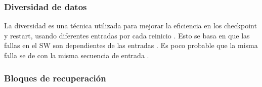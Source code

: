 \begin{comment}

\begin{figure}[h]
 \centering
 \begin{tikzpicture}[node distance=1cm, auto,]
   \tikzset{
   cuadro/.style={
           rectangle,
           draw=black,
           text width=6.5em,
           minimum height=2em,
           text centered},
    arrow/.style={
           ->,
           thick,
           shorten <=2pt,
           shorten >=2pt,}	
    }
  \tikzstyle{circulo} = [draw, fill=black, circle, node distance=1cm, minimum size=5pt, inner 
sep=3pt]
    
  \node[inner sep=5pt] (entrada) {Entrada};
  \node[cuadro, right=0.5cm of entrada] (prim) {Procesador Primario};
  \node[cuadro, inner sep=5pt,below=0.5cm of prim] (secu) {Procesador Secundario};
  \node[cuadro, inner sep=10pt, right=1cm of prim] (selec) {Switch};
  \node[inner sep=0pt, right=2cm of selec](ghost1){};
  \node[cuadro, below=0.5cm of ghost1](detector) {Detector de error};
  \node[inner sep=0pt, right=0.5cm of ghost1] (salida) {Salida};
  
  \draw[arrow] (entrada)--(prim);
  \draw[arrow] (entrada)|-(secu);
  \draw[arrow, dashed] (prim.-30) -- (secu.30);
  \draw[arrow, dashed] (secu.150) -- (prim.-150);
  \draw[arrow] (prim)--(selec);
  \draw[arrow] (secu)-|(selec.-150);
  \draw[arrow] (detector)-|(selec);
  \draw[arrow] (selec)--(salida);
  \draw[arrow] (ghost1)--(detector);
 \end{tikzpicture}
 \caption{Representación del proceso pares}
 \label{fig:repPares}
\end{figure}

\end{comment}

\subsubsection{Diversidad de datos}
La diversidad es una técnica utilizada para mejorar la eficiencia en los checkpoint y restart, 
usando diferentes entradas por cada reinicio \citep{FTDesign}. Esto se basa en que las fallas en el 
\ac{SW} son dependientes de las entradas \citep{FTDesign}. Es poco probable que la misma falla se 
de con la misma secuencia de entrada \citep{FTDesign}.

\subsubsection{Bloques de recuperación}

